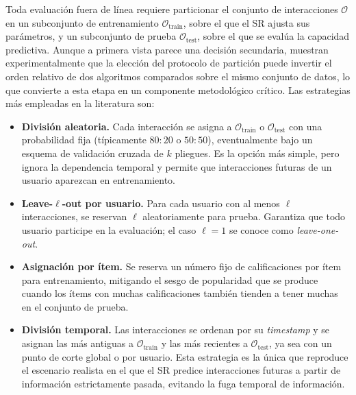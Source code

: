 Toda evaluación fuera de línea requiere particionar el conjunto de interacciones $\mathcal{O}$ en un subconjunto de entrenamiento $\mathcal{O}_\text{train}$, sobre el que el SR ajusta sus parámetros, y un subconjunto de prueba $\mathcal{O}_\text{test}$, sobre el que se evalúa la capacidad predictiva. Aunque a primera vista parece una decisión secundaria, \citet{canamares_offline_2020} muestran experimentalmente que la elección del protocolo de partición puede invertir el orden relativo de dos algoritmos comparados sobre el mismo conjunto de datos, lo que convierte a esta etapa en un componente metodológico crítico. Las estrategias más empleadas en la literatura son:
\begin{itemize}
	\item \textbf{División aleatoria.} Cada interacción se asigna a $\mathcal{O}_\text{train}$ o $\mathcal{O}_\text{test}$ con una probabilidad fija (típicamente $80{:}20$ o $50{:}50$), eventualmente bajo un esquema de validación cruzada de $k$ pliegues. Es la opción más simple, pero ignora la dependencia temporal y permite que interacciones futuras de un usuario aparezcan en entrenamiento.
	\item \textbf{Leave-$\ell$-out por usuario.} Para cada usuario con al menos $\ell$ interacciones, se reservan $\ell$ aleatoriamente para prueba. Garantiza que todo usuario participe en la evaluación; el caso $\ell = 1$ se conoce como \textit{leave-one-out}.
	\item \textbf{Asignación por ítem.} Se reserva un número fijo de calificaciones por ítem para entrenamiento, mitigando el sesgo de popularidad que se produce cuando los ítems con muchas calificaciones también tienden a tener muchas en el conjunto de prueba.
	\item \textbf{División temporal.} Las interacciones se ordenan por su \textit{timestamp} y se asignan las más antiguas a $\mathcal{O}_\text{train}$ y las más recientes a $\mathcal{O}_\text{test}$, ya sea con un punto de corte global o por usuario. Esta estrategia es la única que reproduce el escenario realista en el que el SR predice interacciones futuras a partir de información estrictamente pasada, evitando la fuga temporal de información.
\end{itemize}


